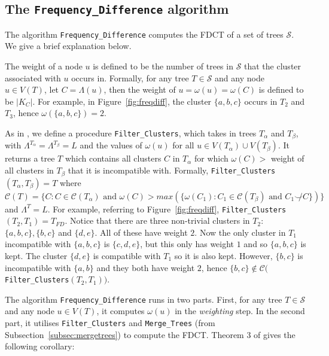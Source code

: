 \documentclass{article}
\newcommand{\compatible}{\smile}
\newcommand{\leafset}{\Lambda}
\newcommand{\weight}{\omega}
\newcommand{\TA}{T_\alpha}
\newcommand{\TB}{T_\beta}
\begin{document}
    \subsection{The \texttt{Frequency\_Difference} algorithm}

    The algorithm \texttt{Frequency\_Difference} \cite{jansson2018algorithms} computes the FDCT of a set of trees $\mathcal{S}$. We give a brief explanation below.

    The weight of a node $u$ is defined to be the number of trees in $\mathcal{S}$ that the cluster associated with $u$ occurs in. Formally, for any tree $T \in \mathcal{S}$ and any node $u \in V(T)$, let $C = \leafset(u)$, then the weight of $u = \weight(u) = \weight(C)$ is defined to be $|K_C|$. For example, in Figure~\ref{fig:freqdiff}, the cluster $\{a, b, c\}$ occurs in $T_2$ and $T_3$, hence $\weight(\{a, b, c\}) = 2$.

    As in \cite{jansson2018algorithms}, we define a procedure \texttt{Filter\_Clusters}, which takes in trees $\TA$ and $\TB$, with $\leafset^{\TA} = \leafset^{\TB} = L$ and the values of $\weight(u)$ for all $u \in V(\TA) \cup V(\TB)$. It returns a tree $T$ which contains all clusters $C$ in $\TA$ for which $\weight(C) > $ weight of all clusters in $\TB$ that it is incompatible with. Formally, \texttt{Filter\_Clusters}$(\TA, \TB) = T$ where $\mathcal{C}(T) = \{C : C \in \mathcal{C}(\TA) \text{ and } \weight(C) > max(\{\weight(C_1) : C_1 \in \mathcal{C}(\TB) \text{ and } C_1 \not\compatible C\})\}$ and $\leafset^T = L$. For example, referring to Figure~\ref{fig:freqdiff}, \texttt{Filter\_Clusters}$(T_2, T_1) = T_{FD}$. Notice that there are three non-trivial clusters in $T_2$: $\{a, b, c\}, \{b, c\}$ and $\{d, e\}$. All of these have weight $2$. Now the only cluster in $T_1$ incompatible with $\{a, b, c\}$ is $\{c, d, e\}$, but this only has weight $1$ and so $\{a, b, c\}$ is kept. The cluster $\{d, e\}$ is compatible with $T_1$ so it is also kept. However, $\{b, c\}$ is incompatible with $\{a, b\}$ and they both have weight $2$, hence $\{b, c\} \not\in \mathcal{C}($\texttt{Filter\_Clusters}$(T_2, T_1))$.

    The algorithm \texttt{Frequency\_Difference} runs in two parts. First, for any tree $T \in \mathcal{S}$ and any node $u \in V(T)$, it computes $\weight(u)$ in the \textit{weighting} step. In the second part, it utilises \texttt{Filter\_Clusters} and \texttt{Merge\_Trees} (from Subsection~\ref{subsec:mergetrees}) to compute the FDCT. Theorem 3 of \cite{jansson2018algorithms} gives the following corollary:
    \newline
\end{document}
